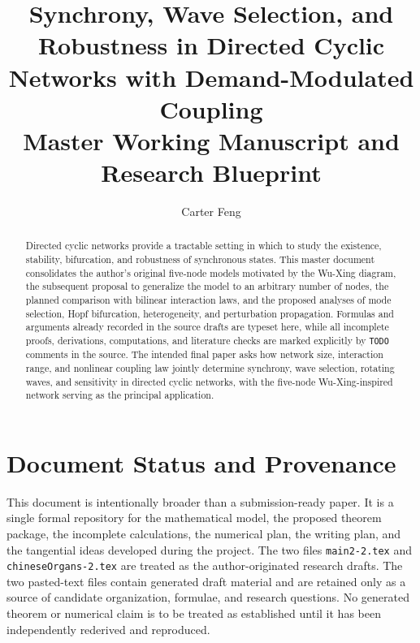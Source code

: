 \documentclass[11pt, reqno]{amsart}
\title[Directed Cyclic Networks]{Synchrony, Wave Selection, and Robustness in Directed Cyclic Networks with Demand-Modulated Coupling\\[0.4em]
	\textnormal{\large Master Working Manuscript and Research Blueprint}}
\author{Carter Feng}
\theoremstyle{definition}
\theoremstyle{remark}
\begin{document}
	
	\begin{abstract}
		Directed cyclic networks provide a tractable setting in which to study the
		existence, stability, bifurcation, and robustness of synchronous states.  This
		master document consolidates the author's original five-node models motivated
		by the Wu-Xing diagram, the subsequent proposal to generalize the model to an
		arbitrary number of nodes, the planned comparison with bilinear interaction
		laws, and the proposed analyses of mode selection, Hopf bifurcation,
		heterogeneity, and perturbation propagation.  Formulas and arguments already
		recorded in the source drafts are typeset here, while all incomplete proofs,
		derivations, computations, and literature checks are marked explicitly by
		\texttt{TODO} comments in the source.  The intended final paper asks how
		network size, interaction range, and nonlinear coupling law jointly determine
		synchrony, wave selection, rotating waves, and sensitivity in directed cyclic
		networks, with the five-node Wu-Xing-inspired network serving as the principal
		application.
	\end{abstract}
	
	\maketitle
	
	
	
	\tableofcontents
	\newpage
	
	\section*{Document Status and Provenance}
	
	This document is intentionally broader than a submission-ready paper.  It is a
	single formal repository for the mathematical model, the proposed theorem
	package, the incomplete calculations, the numerical plan, the writing plan,
	and the tangential ideas developed during the project.  The two files
	\texttt{main2-2.tex} and \texttt{chineseOrgans-2.tex} are treated as the
	author-originated research drafts.  The two pasted-text files contain generated
	draft material and are retained only as a source of candidate organization,
	formulae, and research questions.  No generated theorem or numerical claim is
	to be treated as established until it has been independently rederived and
	reproduced.
	
\end{document}
